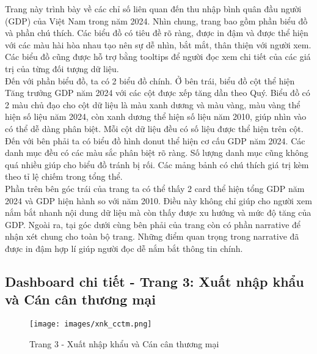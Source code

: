 \documentclass[a4paper]{report}
\begin{document}
{{Trang này trình bày về các chỉ số liên quan đến thu nhập bình quân đầu người (GDP) của Việt Nam trong năm 2024. Nhìn chung, trang bao gồm phần biểu đồ và phần chú thích. Các biểu đồ có tiêu đề rõ ràng, được in đậm và được thể hiện với các màu hài hòa nhau tạo nên sự dễ nhìn, bắt mắt, thân thiện với người xem. Các biểu đồ cũng được hỗ trợ bằng tooltips để người đọc xem chi tiết của các giá trị của từng đối tượng dữ liệu.\\
Đến với phần biểu đồ, ta có 2 biểu đồ chính. Ở bên trái, biểu đồ cột thể hiện Tăng trưởng GDP năm 2024 với các cột được xếp tăng dần theo Quý. Biểu đồ có 2 màu chủ đạo cho cột dữ liệu là màu xanh dương và màu vàng, màu vàng thể hiện số liệu năm 2024, còn xanh dương thể hiện số liệu năm 2010, giúp nhìn vào có thể dễ dàng phân biệt. Mỗi cột dữ liệu đều có số liệu được thể hiện trên cột. Đến với bên phải ta có biểu đồ hình donut thể hiện cơ cấu GDP năm 2024. Các danh mục đều có các màu sắc phân biệt rõ ràng. Số lượng danh mục cũng không quá nhiều giúp cho biểu đồ tránh bị rối. Các mảng bảnh có chú thích giá trị kèm theo tỉ lệ chiếm trong tổng thể.\\
Phần trên bên góc trái của trang ta có thể thấy 2 card thể hiện tổng GDP năm 2024 và GDP hiện hành so với năm 2010. Điều này không chỉ giúp cho người xem nắm bắt nhanh nội dung dữ liệu mà còn thấy được xu hướng và mức độ tăng của GDP. Ngoài ra, tại góc dưới cùng bên phải của trang còn có phần narrative để nhận xét chung cho toàn bộ trang. Những điểm quan trọng trong narrative đã được in đậm hợp lí giúp người đọc dễ nắm bắt thông tin chính.

\newpage
\subsection{Dashboard chi tiết - Trang 3: Xuất nhập khẩu và Cán cân thương mại}


\begin{figure}[H]
    \centering
    \texttt{[image: images/xnk\_cctm.png]}
    \caption{Trang 3 - Xuất nhập khẩu và Cán cân thương mại}
    \label{fig:enter-label}
\end{figure}


}}
\end{document}
